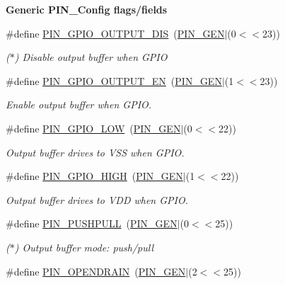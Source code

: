 \begin{Indent}{\bf Generic P\-I\-N\-\_\-\-Config flags/fields}
\begin{DoxyCompactItemize}
\#define \hyperlink{_p_i_n_8h_a8728d817e2f0f18c5fccce87e13d3c34}{P\-I\-N\-\_\-\-G\-P\-I\-O\-\_\-\-O\-U\-T\-P\-U\-T\-\_\-\-D\-I\-S}~(\hyperlink{_p_i_n_8h_ae1f7e47a17caab9697e69e5b9aff270b}{P\-I\-N\-\_\-\-G\-E\-N}$|$(0$<$$<$23))
\begin{DoxyCompactList}\small\item\em ($\ast$) Disable output buffer when G\-P\-I\-O \end{DoxyCompactList}\item 
\#define \hyperlink{_p_i_n_8h_a086fd19a419fb4b09f30ed993a3088c7}{P\-I\-N\-\_\-\-G\-P\-I\-O\-\_\-\-O\-U\-T\-P\-U\-T\-\_\-\-E\-N}~(\hyperlink{_p_i_n_8h_ae1f7e47a17caab9697e69e5b9aff270b}{P\-I\-N\-\_\-\-G\-E\-N}$|$(1$<$$<$23))
\begin{DoxyCompactList}\small\item\em Enable output buffer when G\-P\-I\-O. \end{DoxyCompactList}\item 
\#define \hyperlink{_p_i_n_8h_a269b0e2fe279666149ca1c5949bb32ca}{P\-I\-N\-\_\-\-G\-P\-I\-O\-\_\-\-L\-O\-W}~(\hyperlink{_p_i_n_8h_ae1f7e47a17caab9697e69e5b9aff270b}{P\-I\-N\-\_\-\-G\-E\-N}$|$(0$<$$<$22))
\begin{DoxyCompactList}\small\item\em Output buffer drives to V\-S\-S when G\-P\-I\-O. \end{DoxyCompactList}\item 
\#define \hyperlink{_p_i_n_8h_aee8e9896270f36a15df12fb85f2cb4ad}{P\-I\-N\-\_\-\-G\-P\-I\-O\-\_\-\-H\-I\-G\-H}~(\hyperlink{_p_i_n_8h_ae1f7e47a17caab9697e69e5b9aff270b}{P\-I\-N\-\_\-\-G\-E\-N}$|$(1$<$$<$22))
\begin{DoxyCompactList}\small\item\em Output buffer drives to V\-D\-D when G\-P\-I\-O. \end{DoxyCompactList}\item 
\#define \hyperlink{_p_i_n_8h_a8b219fa4a7727c4f5a7beb5134144324}{P\-I\-N\-\_\-\-P\-U\-S\-H\-P\-U\-L\-L}~(\hyperlink{_p_i_n_8h_ae1f7e47a17caab9697e69e5b9aff270b}{P\-I\-N\-\_\-\-G\-E\-N}$|$(0$<$$<$25))
\begin{DoxyCompactList}\small\item\em ($\ast$) Output buffer mode\-: push/pull \end{DoxyCompactList}\item 
\#define \hyperlink{_p_i_n_8h_a7d238d7776de5cc504dc37d62ac61295}{P\-I\-N\-\_\-\-O\-P\-E\-N\-D\-R\-A\-I\-N}~(\hyperlink{_p_i_n_8h_ae1f7e47a17caab9697e69e5b9aff270b}{P\-I\-N\-\_\-\-G\-E\-N}$|$(2$<$$<$25))

\end{DoxyCompactItemize}
\end{Indent}
